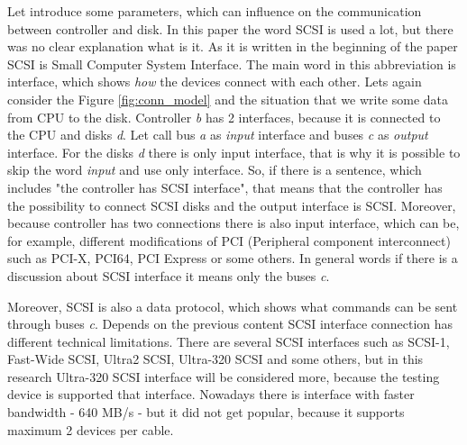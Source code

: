 Let introduce some parameters, which can influence on the communication between controller and disk. 
In this paper the word SCSI is used a lot, but there was no clear explanation what is it. As it is written in the beginning of the paper SCSI is Small Computer System Interface. The main word in this abbreviation is interface, which shows \emph{how} the devices connect with each other. Lets again consider the Figure \ref{fig:conn_model} and the situation that we write some data from CPU to the disk. Controller \emph{b} has 2 interfaces, because it is connected to the CPU and disks \emph{d}. Let call bus \emph{a} as \emph{input} interface and buses \emph{c} as \emph{output} interface. For the disks \emph{d} there is only input interface, that is why it is possible to skip the word \emph{input} and use only interface. So, if there is a sentence, which includes "the controller has SCSI interface", that means that the controller has the possibility to connect SCSI disks and the output interface is SCSI. Moreover, because controller has two connections there is also input interface, which can be, for example, different modifications of PCI (Peripheral component interconnect) such as PCI-X, PCI64, PCI Express or some others. In general words if there is a discussion about SCSI interface it means only the buses \emph{c}.

Moreover, SCSI is also a data protocol, which shows what commands can be sent through buses \emph{c}. Depends on the previous content SCSI interface connection has different technical limitations. There are several SCSI interfaces such as SCSI-1, Fast-Wide SCSI, Ultra2 SCSI, Ultra-320 SCSI and some others, but in this research Ultra-320 SCSI interface will be considered more, because the testing device is supported that interface. Nowadays there is interface with faster bandwidth - 640 MB/s - but it did not get popular, because it supports maximum 2 devices per cable.

